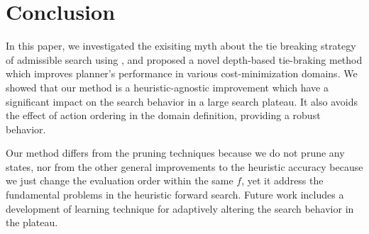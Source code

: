 \section{Conclusion}

In this paper, we investigated the exisiting myth about the tie breaking
strategy of admissible search using \astar, and proposed a novel
depth-based tie-braking method which improves planner's performance in various
cost-minimization domains.
We showed that
our method is a heuristic-agnostic improvement which have a significant
impact on the search behavior in a large search plateau.
It also avoids the effect of action ordering in the domain definition,
providing a robust behavior.


Our method differs from the pruning techniques because we do not prune
any states, nor from the other general improvements to the heuristic
accuracy because we just change the evaluation order within the same
$f$, yet it address the fundamental problems in the heuristic forward
search. 
% 
Future work includes a development of learning technique for
adaptively altering the search behavior in the plateau.



